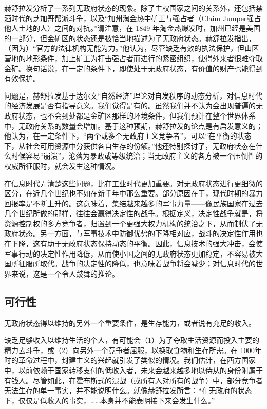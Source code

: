 赫舒拉发分析了一系列无政府状态的现象。除了主权国家之间的关系外，还包括禁酒时代的芝加哥帮派斗争，以及“加州淘金热中矿工与强占者（Claim Jumper强占他人土地的人）之间的对抗。”请注意，在 1849 年淘金热爆发时，加州已经是美国的一部分，但金矿区的状态还是被恰当地描述为了无政府状态。赫舒拉发指出，（因为）“官方的法律机构无能为力。”他认为，尽管缺乏有效的执法保护，但山区营地的地形条件，加上矿工为打击强占者而进行的紧密组织，使得外来者很难夺取金矿。换句话说，在一定的条件下，即使处于无政府状态，有价值的财产也能得到有效保护。

问题是，赫舒拉发基于达尔文“自然经济”理论对自发秩序的动态分析，对信息时代的经济发展是否有指导意义。我们觉得是有的。虽然我们并不认为会出现普遍的无政府状态，也不会到处都是金矿区那样的环境条件，但我们预计在整个世界体系中，无政府关系的数量会增加。基于这种预期，赫舒拉发的论点是有启发意义的；他认为，在一定条件下，“两个或多个无政府主义竞争者”，可以“在平衡的状态下，从社会可用资源中分获供各自生存的份额。”他还特别探讨了，无政府状态在什么时候容易“崩溃”，沦落为暴政或等级统治；当无政府主义的各方被一个压倒性的权威所征服时，就会发生这种情况。

在信息时代弄清楚这些问题，比在工业时代更加重要。对无政府状态进行更细微的区分，在近几个世纪也不如在新千年中那么重要。部分原因在于，现代时期的暴力回报率是不断上升的。这意味着，集结越来越多的军事力量——像民族国家在过去几个世纪所做的那样，往往会赢得决定性的战争。根据定义，决定性战争就是，将资源控制权的多方竞争者，归置到一个更强大权力机构的统治之下，从而制伏了无政府状态。另一方面，与军事技术中防御优势的下降相对应，战斗的决定性作用也在下降，这有助于无政府状态保持动态的平衡。因此，信息技术的强大冲击，会使军事行动的决定性作用降低，从而使小国之间的无政府状态更加稳定，不容易被大国所征服所取代。战争的决定性的降低，也意味着战争将会减少；对信息时代的世界来说，这是一个令人鼓舞的推论。

\subsection{可行性}
无政府状态得以维持的另外一个重要条件，是生存能力，或者说有充足的收入。

缺乏足够收入以维持生活的个人，有可能会（1）为了夺取生活资源而投入主要的精力去斗争，或（2）向另外一个竞争者屈服，以换取食物和生存所需。在 1000年时的革命过程中，封建主义的兴起就引发了类似的情况。我们估计，在西方国家中，以前依赖于国家转移支付的低收入者，未来会越来越多地以侍从的身份附属于有钱人。尽管如此，在霍布斯式的混战（或所有人对所有的战争）中，部分竞争者无法生存的单一事实，并不能说明什么。就像赫舒拉发所言：“在无政府的状态下，仅仅是低收入的事实，……本身并不能表明接下来会发生什么。”
